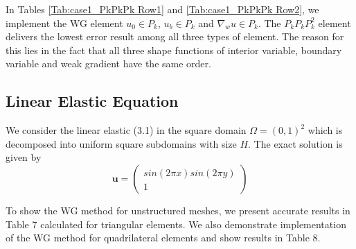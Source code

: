 						In Tables \ref{Tab:case1_PkPkPk Row1} and \ref{Tab:case1_PkPkPk Row2}, we implement the WG element $ u_{0} \in P_{k} $, $ u_{b} \in P_{k} $ and $ \nabla_{w} u \in P_{k} $. The $ P_k P_k P_k^2 $ element delivers the lowest error result among all three types of element. The reason for this lies in the fact that all three shape functions of interior variable, boundary variable and weak gradient have the same order.
						
						
						\subsection{Linear Elastic Equation}
						
						We consider the linear elastic (3.1) in the square domain $ \Omega = (0, 1)^{2} $ which is decomposed into uniform square subdomains with size $ H $. The exact solution is given by
						\begin{equation}
						\mathbf{u} = \begin{pmatrix}
						sin(2\pi x)sin(2\pi y) \\ 1
						\end{pmatrix}
						\end{equation}
						
						To show the WG method for unstructured meshes, we present accurate results in Table 7 calculated for triangular elements. We also demonstrate implementation of the WG method for quadrilateral elements and show results in Table 8.
						
